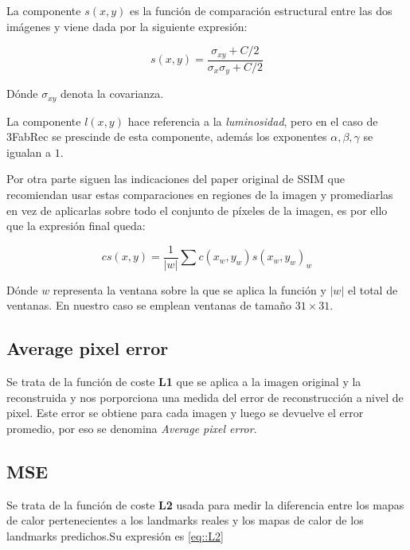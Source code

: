             \medskip

            \noindent La componente $s(x,y)$ es la función de comparación estructural entre las dos imágenes y viene dada por la siguiente expresión:

            \begin{equation}
                s(x,y)=\frac{\sigma_{xy}+C/2}{\sigma_x \sigma_y +C/2}
            \end{equation}

            \noindent Dónde $\sigma_{xy}$ denota la covarianza.

            \medskip

            \noindent La componente $l(x,y)$ hace referencia a la \textit{luminosidad}, pero en el caso de 3FabRec se prescinde de esta componente, además los exponentes $\alpha, \beta , \gamma$ se igualan a $1$.

            \medskip

            \noindent Por otra parte siguen las indicaciones del paper original de SSIM que recomiendan usar estas comparaciones en regiones de la imagen y promediarlas en vez de aplicarlas sobre todo el conjunto de píxeles de la imagen, es por ello que la expresión final queda:

            \begin{equation}
                cs(x,y)=\frac{1}{|w|} \sum{c(x_w,y_w)s(x_w,y_w)}_w
            \end{equation}

            \noindent Dónde $w$ representa la ventana sobre la que se aplica la función y $|w|$ el total de ventanas. En nuestro caso se emplean ventanas de tamaño $31\times 31$.

        \subsection{Average pixel error}
            \noindent Se trata de la función de coste \textbf{L1} que se aplica a la imagen original y la reconstruida  y nos porporciona una medida del error de reconstrucción a nivel de pixel. Este error se obtiene para cada imagen y luego se devuelve el error promedio, por eso se denomina \textit{Average pixel error}.

        \subsection{MSE}
            \noindent Se trata de la función de coste \textbf{L2} usada para medir la diferencia entre los mapas de calor pertenecientes a los landmarks reales y los mapas de calor de los landmarks predichos.Su expresión es \eqref{eq::L2}


\endinput

